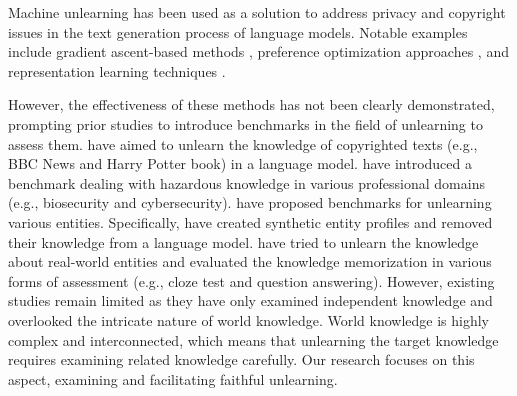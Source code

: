 
Machine unlearning has been used as a solution to address privacy and copyright issues in the text generation process of language models.
Notable examples include gradient ascent-based methods \citep{jang2022knowledge, yao2023large, barbulescu2024each}, preference optimization approaches \citep{rafailov2024direct, zhang2024negative, jin2024rwku}, and representation learning techniques \citep{li2024wmdp, yao2024machine}.

However, the effectiveness of these methods has not been clearly demonstrated, prompting prior studies to introduce benchmarks in the field of unlearning to assess them.
\citet{eldan2023s, shi2024muse, tian2024forget} have aimed to unlearn the knowledge of copyrighted texts (e.g., BBC News and Harry Potter book) in a language model.
\citet{li2024wmdp} have introduced a benchmark dealing with hazardous knowledge in various professional domains (e.g., biosecurity and cybersecurity).
\citet{maini2024tofu, jin2024rwku} have proposed benchmarks for unlearning various entities. Specifically, \citet{maini2024tofu} have created synthetic entity profiles and removed their knowledge from a language model.
\citet{jin2024rwku} have tried to unlearn the knowledge about real-world entities and evaluated the knowledge memorization in various forms of assessment (e.g., cloze test and question answering).
However, existing studies remain limited as they have only examined independent knowledge and overlooked the intricate nature of world knowledge.
World knowledge is highly complex and interconnected, which means that unlearning the target knowledge requires examining related knowledge carefully.
Our research focuses on this aspect, examining and facilitating faithful unlearning.





